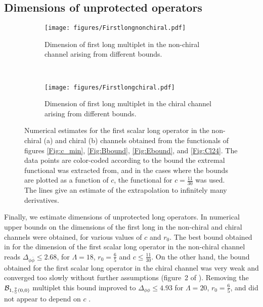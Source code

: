 \subsection{Dimensions of unprotected operators}
\label{sec:dimensions}

\begin{figure}[htbp!]
\begin{center}
	\begin{subfigure}[t]{0.5\textwidth}        
	\texttt{[image: figures/Firstlongnonchiral.pdf]}
	\caption{Dimension of first long multiplet in the non-chiral channel arising from different bounds.}
	\label{Fig:firstnonchirallong}
	\end{subfigure}~
	\begin{subfigure}[t]{0.5\textwidth}
	\texttt{[image: figures/Firstlongchiral.pdf]}
	\caption{Dimension of first long multiplet in the chiral channel arising from different bounds.}
	\label{Fig:firstchirallong}
	\end{subfigure}
\end{center}
\caption{Numerical estimates for the first scalar long operator in the non-chiral (a) and chiral (b) channels obtained from the functionals of figures \ref{Fig:c_min}, \ref{Fig:Bbound}, \ref{Fig:Ebound}, and \ref{Fig:Cl24}. The data points are color-coded according to the bound the extremal functional was extracted from, and in the cases where the bounds are plotted as a function of $c$, the functional for $c=\tfrac{11}{30}$ was used. The lines give an estimate of the extrapolation to infinitely many derivatives.}
\end{figure}

Finally, we estimate dimensions of unprotected long operators. In \cite{Beem:2014zpa,Lemos:2015awa} numerical upper bounds on the dimensions of the first long in the non-chiral and chiral channels were obtained, for various values of $c$ and  $r_0$. The best bound obtained in \cite{Beem:2014zpa} for the dimension of the first scalar long operator in the  non-chiral channel reads $\Delta_{\phi \bar{\phi}} \leqslant 2.68$, for $\Lambda=18$, $r_0=\frac65$ and $c\leqslant\tfrac{11}{30}$. On the other hand, the bound obtained for the first scalar long operator in the chiral channel was very weak and converged too slowly without further assumptions (figure~2 of \cite{Lemos:2015awa}). Removing the ${\mathcal{B}}_{1,\frac75(0,0)}$ multiplet this bound improved to $\Delta_{\phi \phi} \leqslant 4.93 $ for $\Lambda=20$, $r_0=\frac65$, and did not appear to depend on $c$ \cite{Lemos:2015awa}.

